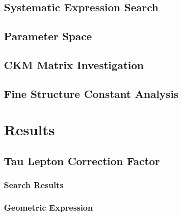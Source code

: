 \documentclass[11pt,a4paper]{article}
\begin{document}
\subsection{Systematic Expression Search}

\subsection{Parameter Space}

\subsection{CKM Matrix Investigation}

\subsection{Fine Structure Constant Analysis}

\section{Results}

\subsection{Tau Lepton Correction Factor}

\subsubsection{Search Results}

\subsubsection{Geometric Expression}
\end{document}
